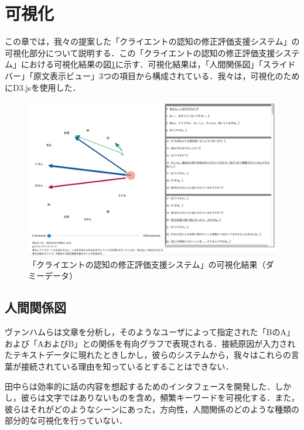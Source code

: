\documentclass[shuuron]{kuee}
\begin{document}

\section{可視化}

この章では，我々の提案した「クライエントの認知の修正評価支援システム」の可視化部分について説明する．この「クライエントの認知の修正評価支援システム」における可視化結果の図\ref{fig:dummyChara}に示す．可視化結果は，「人間関係図」「スライドバー」「原文表示ビュー」3つの項目から構成されている．我々は，可視化のためにD3.js\cite{vand3}を使用した．%

\begin{figure}
  \begin{center}
    \includegraphics[width=\linewidth]{dummyChara.png}
  \end{center}
  \caption{「クライエントの認知の修正評価支援システム」の可視化結果（ダミーデータ）}
  \label{fig:dummyChara}
\end{figure}

\subsection{人間関係図}

ヴァンハムら\cite{van2009mapping}は文章を分析し，そのようなユーザによって指定された「BのA」および「AおよびB」との関係を有向グラフで表現される．接続原因が入力されたテキストデータに現れたときしかし，彼らのシステムから，我々はこれらの言葉が接続されている理由を知っているとすることはできない．

田中ら\cite{tanaka}は効率的に話の内容を想起するためのインタフェースを開発した．しかし，彼らは文字ではありないものを含め，頻繁キーワードを可視化する．また，彼らはそれがどのようなシーンにあった，方向性，人間関係のどのような種類の部分的な可視化を行っていない．
\end{document}
